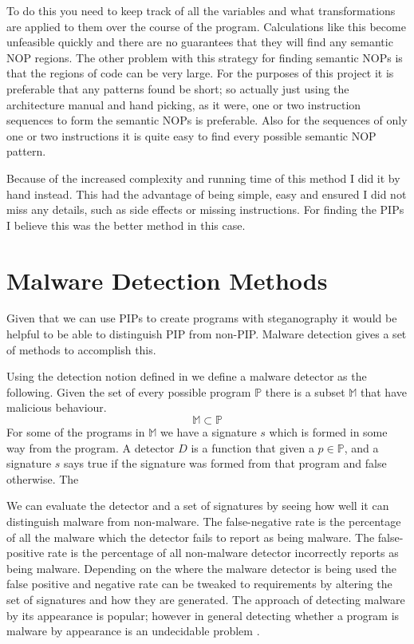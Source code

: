 \documentclass[10pt,]{book}
\begin{document}
To do this you need to keep track of all the variables and what
transformations are applied to them over the course of the program.
Calculations like this become unfeasible quickly and there are no
guarantees that they will find any semantic NOP regions. The other
problem with this strategy for finding semantic NOPs is that the regions
of code can be very large. For the purposes of this project it is
preferable that any patterns found be short; so actually just using the
architecture manual and hand picking, as it were, one or two instruction
sequences to form the semantic NOPs is preferable. Also for the
sequences of only one or two instructions it is quite easy to find every
possible semantic NOP pattern.

Because of the increased complexity and running time of this method I
did it by hand instead. This had the advantage of being simple, easy and
ensured I did not miss any details, such as side effects or missing
instructions. For finding the PIPs I believe this was the better method
in this case.

\section{Malware Detection Methods}

Given that we can use PIPs to create programs with steganography it
would be helpful to be able to distinguish PIP from non-PIP. Malware
detection gives a set of methods to accomplish this.

Using the detection notion defined in \autocite{Preda:2007ky} we define
a malware detector as the following. Given the set of every possible
program $\mathbb{P}$ there is a subset $\mathbb{M}$ that have malicious
behaviour. \[\mathbb{M\subset P}\] For some of the programs in
$\mathbb{M}$ we have a signature $s$ which is formed in some way from
the program. A detector $D$ is a function that given a $p\in\mathbb{P}$,
and a signature $s$ says true if the signature was formed from that
program and false otherwise. The

We can evaluate the detector and a set of signatures by seeing how well
it can distinguish malware from non-malware. The false-negative rate is
the percentage of all the malware which the detector fails to report as
being malware. The false-positive rate is the percentage of all
non-malware detector incorrectly reports as being malware. Depending on
the where the malware detector is being used the false positive and
negative rate can be tweaked to requirements by altering the set of
signatures and how they are generated. The approach of detecting malware
by its appearance is popular; however in general detecting whether a
program is malware by appearance is an undecidable problem
\autocite{Cohen:1987wt}\autocite{Shyamasundar:2010tl}.
\end{document}
